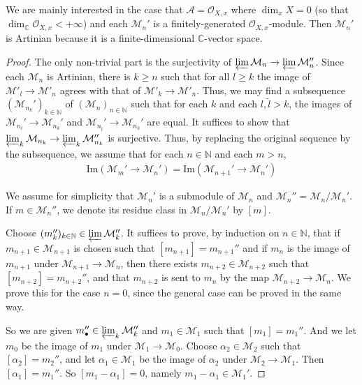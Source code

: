 \documentclass[12pt,b5paper,notitlepage]{report}
\theoremstyle{definition}
\theoremstyle{plain}
\newcommand{\mc}{\mathcal}
\newcommand{\wtd}{\widetilde}
\newcommand{\scr}{\mathscr}
\newcommand{\blt}{\bullet}
\newcommand{\Cbb}{\mathbb C}
\newcommand{\Nbb}{\mathbb N}
\newcommand{\Imag}{\mathrm{Im}}
\numberwithin{equation}{section}
\begin{document}
We are mainly interested in the case that $\mc A=\scr O_{X,x}$ where $\dim_xX=0$ (so that $\dim_\Cbb \scr O_{X,x}<+\infty$) and each $\mc M_n'$ is a finitely-generated $\scr O_{X,x}$-module. Then $\mc M_n'$ is Artinian because it is a finite-dimensional $\Cbb$-vector space.

\begin{proof}
The only non-trivial part is the surjectivity of $\varprojlim \mc M_n\rightarrow \varprojlim \mc M_n''$. Since each $\mc M_n$ is Artinian, there is $k\geq n$ such that for all $l\geq k$ the image of $\mc M'_l\rightarrow\mc M'_n$ agrees with that of $\mc M'_k\rightarrow\mc M'_n$. Thus, we may find a subsequence $(\mc M_{n_k}')_{k\in\Nbb}$ of $(\mc M_n)_{n\in\Nbb}$ such that for each $k$ and each $l,\wtd l>k$, the images of $\mc M_{n_l}'\rightarrow\mc M_{n_k}'$ and $\mc M_{n_{\wtd l}}'\rightarrow\mc M_{n_k}'$ are equal. It suffices to show that $\varprojlim_k\mc M_{n_k}\rightarrow \varprojlim_k\mc M_{n_k}''$ is surjective. Thus, by replacing the original sequence by the subsequence, we assume that for each $n\in\Nbb$ and each $m>n$,
\begin{align*}
\Imag(\mc M_m'\rightarrow\mc M_n')=\Imag(\mc M_{n+1}'\rightarrow\mc M_n')
\end{align*}

We assume for simplicity that $\mc M_n'$ is a submodule of $\mc M_n$ and $\mc M_n''=\mc M_n/\mc M_n'$. If $m\in\mc M_n''$, we denote its residue class in $\mc M_n/\mc M_n'$ by $[m]$. 

Choose $(m_k'')_{k\in\Nbb}\in\varprojlim\mc M_k''$. It suffices to prove, by induction on $n\in\Nbb$, that if  $m_{n+1}\in\mc M_{n+1}$ is chosen such that $[m_{n+1}]=m_{n+1}''$ and if $m_n$ is the image of $m_{n+1}$ under $\mc M_{n+1}\rightarrow\mc M_n$, then there exists $m_{n+2}\in\mc M_{n+2}$ such that $[m_{n+2}]=m_{n+2}''$, and that $m_{n+2}$ is sent to $m_n$ by the map $\mc M_{n+2}\rightarrow\mc M_n$. We prove this for the case $n=0$, since the general case can be proved in the same way.

So we are given $m_\blt''\in\varprojlim_k\mc M_k''$ and $m_1\in \mc M_1$ such that $[m_1]=m_1''$. And we let $m_0$ be the image of $m_1$ under $\mc M_1\rightarrow\mc M_0$. Choose $\alpha_2\in\mc M_2$ such that $[\alpha_2]=m_2''$, and let $\alpha_1\in\mc M_1$ be the image of $\alpha_2$ under $\mc M_2\rightarrow\mc M_1$. Then $[\alpha_1]=m_1''$. So $[m_1-\alpha_1]=0$, namely $m_1-\alpha_1\in\mc M_1'$.


\end{proof}
\end{document}

